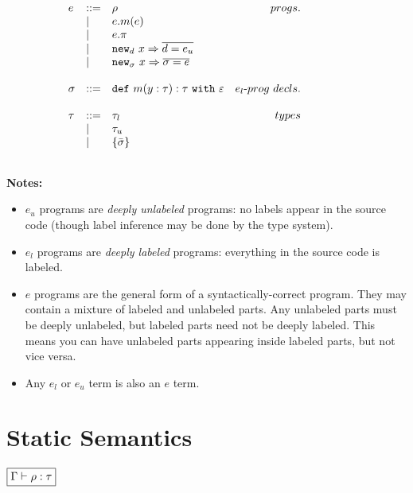 \documentclass{llncs}
\newcommand{\keywadj}[1]{\mathtt{#1}}
\newcommand{\keyw}[1]{\keywadj{#1}~}
\newcommand{\kw}[1]{\keyw{ #1 }}
\newcommand{\kwa}[1]{\keywadj{ #1 }}
\newcommand{\hyphen}{\hbox{-}}
\begin{document}
\[\begin{array}{lll}
\begin{array}{lllr}
	
	
	
	
	
	
	
	
e & ::= & \rho & progs. \\
	& | & e.m(e) \\
	& | & e.\pi \\
	& | & \kwa{new}_d~x \Rightarrow \overline{d = e_u} \\
	& | & \kwa{new}_\sigma~x \Rightarrow \overline{\sigma = e} \\
	&&\\
	
\sigma & ::= & \kwa{def}~m(y : \tau) : \tau~\kw{with} \varepsilon & e_l \hyphen prog~decls. \\
	&&\\
	
\tau & ::= & \tau_l & types \\
	& | & \tau_u \\
	& | & \{ \bar \sigma \} \\
	&&\\
		
		
\end{array}
& ~~~~~~
&
\end{array}
\]

\noindent \textbf{Notes:}

\begin{itemize}
	\item $e_u$ programs are \textit{deeply unlabeled} programs: no labels appear in the source code (though label inference may be done by the type system).
	\item $e_l$ programs are \textit{deeply labeled} programs: everything in the source code is labeled.
	\item $e$ programs are the general form of a syntactically-correct program. They may contain a mixture of labeled and unlabeled parts. Any unlabeled parts must be deeply unlabeled, but labeled parts need not be deeply labeled. This means you can have unlabeled parts appearing inside labeled parts, but not vice versa.
	\item Any $e_l$ or $e_u$ term is also an $e$ term.
\end{itemize}


\section{Static Semantics}

\noindent
$\fbox{$\Gamma \vdash \rho : \tau$}$
\end{document}
